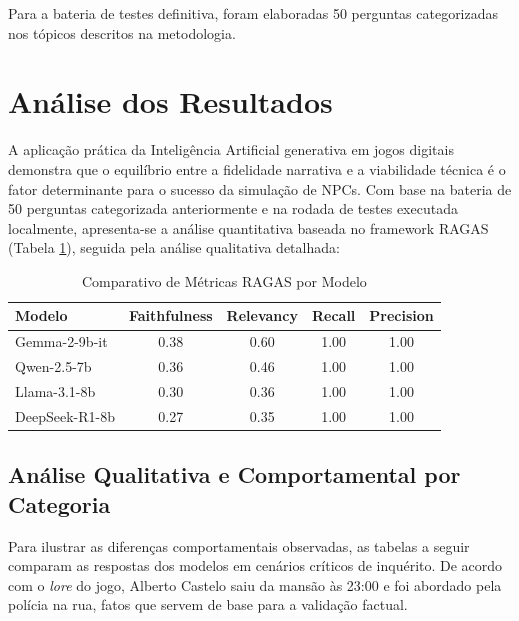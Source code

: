 \documentclass[12pt]{article}
\begin{document}
Para a bateria de testes definitiva, foram elaboradas 50 perguntas categorizadas nos tópicos descritos na metodologia.

\section{Análise dos Resultados}

A aplicação prática da Inteligência Artificial generativa em jogos digitais demonstra que o equilíbrio entre a fidelidade narrativa e a viabilidade técnica é o fator determinante para o sucesso da simulação de NPCs. Com base na bateria de 50 perguntas categorizada anteriormente e na rodada de testes executada localmente, apresenta-se a análise quantitativa baseada no framework RAGAS (Tabela \ref{tab:ragas_comparativo}), seguida pela análise qualitativa detalhada:

\begin{table}[h!]
\centering
\caption{Comparativo de Métricas RAGAS por Modelo}
\vspace{0.2cm}
\label{tab:ragas_comparativo}
\renewcommand{\arraystretch}{1.3}
\begin{tabular}{|l|c|c|c|c|}
\hline
\textbf{Modelo} & \textbf{Faithfulness} & \textbf{Relevancy} & \textbf{Recall} & \textbf{Precision} \\ \hline
Gemma-2-9b-it & 0.38 & 0.60 & 1.00 & 1.00 \\ \hline
Qwen-2.5-7b & 0.36 & 0.46 & 1.00 & 1.00 \\ \hline
Llama-3.1-8b & 0.30 & 0.36 & 1.00 & 1.00 \\ \hline
DeepSeek-R1-8b & 0.27 & 0.35 & 1.00 & 1.00 \\ \hline
\end{tabular}
\end{table}

\subsection{Análise Qualitativa e Comportamental por Categoria}

Para ilustrar as diferenças comportamentais observadas, as tabelas a seguir comparam as respostas dos modelos em cenários críticos de inquérito. De acordo com o \textit{lore} do jogo, Alberto Castelo saiu da mansão às 23:00 e foi abordado pela polícia na rua, fatos que servem de base para a validação factual.
\end{document}
